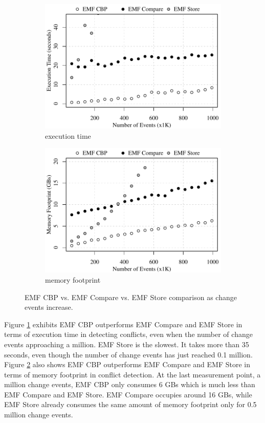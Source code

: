 \begin{figure}[ht]
\begin{subfigure}[t]{0.490\linewidth}
	\includegraphics[width=\linewidth]{conflict-time-events}
	\caption{execution time}
	\label{fig:conflict-time-events}
\end{subfigure}
\hfill
\begin{subfigure}[t]{0.490\linewidth}
	\includegraphics[width=\linewidth]{conflict-memory-events}
	\caption{memory footprint}
	\label{fig:conflict-memory-events}
\end{subfigure}
\caption{EMF CBP vs. EMF Compare vs. EMF Store comparison as change events increase.}
\label{fig:conflict_events}
\end{figure}

Figure \ref{fig:conflict-time-events} exhibits EMF CBP outperforms EMF Compare and EMF Store in terms of execution time in detecting conflicts, even when the number of change events approaching a million. EMF Store is the slowest. It takes more than 35 seconds, even though the number of change events has just reached 0.1 million. Figure \ref{fig:conflict-memory-events} also shows EMF CBP outperforms EMF Compare and EMF Store in terms of memory footprint in conflict detection. At the last measurement point, a million change events, EMF CBP only consumes 6 GBs which is much less than EMF Compare and EMF Store. EMF Compare occupies around 16 GBs, while EMF Store already consumes the same amount of memory footprint only for 0.5 million change events.

